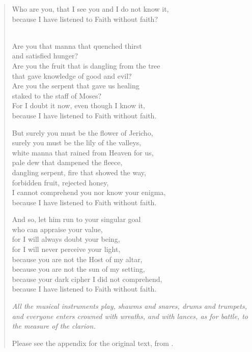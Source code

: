 \begin{verse}
Who are you, that I see you and I do not know it,\\
because I have listened to Faith without faith? 

\Dots\\
Are you that manna that quenched thirst\\
and satisfied hunger?\\
Are you the fruit that is dangling from the tree\\
that gave knowledge of good and evil?\\
Are you the serpent that gave us healing\\
staked to the staff of Moses?\\
For I doubt it now, even though I know it,\\
because I have listened to Faith without faith. 

But surely you must be the flower of Jericho,\\
surely you must be the lily of the valleys,\\
white manna that rained from Heaven for us,\\
pale dew that dampened the fleece,\\
dangling serpent, fire that showed the way,\\
forbidden fruit, rejected honey,\\
I cannot comprehend you nor know your enigma,\\
because I have listened to Faith without faith. 

And so, let him run to your singular goal\\
who can appraise your value,\\
for I will always doubt your being,\\
for I will never perceive your light,\\
because you are not the Host of my altar,\\
because you are not the sun of my setting,\\
because your dark cipher I did not comprehend,\\
because I have listened to Faith without faith. 

\emph{All the musical instruments play, shawms and snares, drums and trumpets,
and everyone enters crowned with wreaths, and with lances, as for battle, 
to the measure of the clarion.}%
  \begin{Footnote}
  Please see the appendix\XXX{} for the original text, from \autocite[]{Calderon:Retiro}.
  \end{Footnote}
\end{verse}

